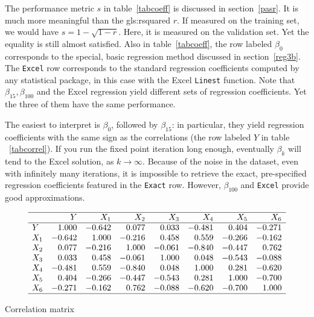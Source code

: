 \documentclass[oneside,10pt]{book}
\begin{document}
The performance metric $s$ in table~\ref{tabcoeff} is discussed in section~\ref{pasr}. It is much more meaningful than the \gls{gls:rsquared} $r$. If measured on the training set, we would have $s=1-\sqrt{1-r}$. Here, it is measured on the validation set. Yet the equality is still almost satisfied. Also in table~\ref{tabcoeff}, the row labeled $\beta_0$ corresponds to the special, basic regression method discussed in section~\ref{reg3b}. The \texttt{Excel} row corresponds to the standard regression coefficients computed by any statistical package, in this case with the Excel \texttt{Linest} function. Note that $\beta_{15},\beta_{100}$ and the Excel regression yield different sets of regression coefficients. Yet the three of them have the same performance. 

The easiest to interpret is $\beta_0$, followed by $\beta_{15}$: in particular, they yield regression coefficients with the same sign as the correlations (the row labeled $Y$ in table ~\ref{tabcorrel}). If you run the fixed point iteration long enough, eventually $\beta_k$ will tend to the Excel solution, as $k\rightarrow\infty$. Because of the noise in the dataset, even with infinitely many iterations, it is impossible to retrieve the exact, pre-specified regression coefficients featured in the \texttt{Exact} row.
However, $\beta_{100}$ and \texttt{Excel} provide good approximations.


\begin{table}%
\small
\[
\begin{array}{lrrrrrrr}
\hline
  &  Y & X_1 & X_2  & X_3 & X_4 & X_5 & X_6\\
\hline
Y	&	1.000	&	-0.642	&	0.077	&	0.033	&	-0.481	&	0.404	&	-0.271	\\
X_1	&	-0.642	&	1.000	&	-0.216	&	0.458	&	0.559	&	-0.266	&	-0.162	\\
X_2	&	0.077	&	-0.216	&	1.000	&	-0.061	&	-0.840	&	-0.447	&	0.762	\\
X_3	&	0.033	&	0.458	&	-0.061	&	1.000	&	0.048	&	-0.543	&	-0.088	\\
X_4	&	-0.481	&	0.559	&	-0.840	&	0.048	&	1.000	&	0.281	&	-0.620	\\
X_5	&	0.404	&	-0.266	&	-0.447	&	-0.543	&	0.281	&	1.000	&	-0.700	\\
X_6	&	-0.271	&	-0.162	&	0.762	&	-0.088	&	-0.620	&	-0.700	&	1.000	\\
\hline
\end{array}
\]
\caption{\label{tabcorrel}Correlation matrix}
\end{table}
\end{document}
